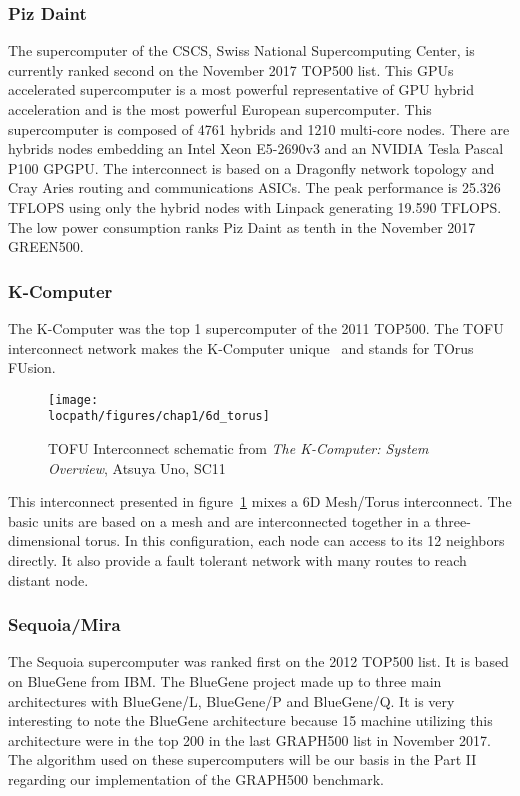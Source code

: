 \subsubsection{Piz Daint}
The supercomputer of the CSCS, Swiss National Supercomputing Center, is currently ranked second on the November 2017 TOP500 list. 
This GPUs accelerated supercomputer is a most powerful representative of GPU hybrid acceleration and is the most powerful European supercomputer. 
This supercomputer is composed of 4761 hybrids and 1210 multi-core nodes. 
There are hybrids nodes embedding an Intel Xeon E5-2690v3 and an NVIDIA Tesla Pascal P100 GPGPU. 
The interconnect is based on a Dragonfly network topology and Cray Aries routing and communications ASICs. 
The peak performance is 25.326 TFLOPS using only the hybrid nodes with Linpack generating 19.590 TFLOPS.
The low power consumption ranks Piz Daint as tenth in the November 2017 GREEN500.

\subsubsection{K-Computer}
The K-Computer was the top 1 supercomputer of the 2011 TOP500. 
The TOFU interconnect network makes the K-Computer unique~\cite{ajima2009tofu} and stands for TOrus FUsion.
\begin{figure}[t!]
\begin{center}
\texttt{[image: \\locpath/figures/chap1/6d\_torus]}
\end{center}
\caption[The TOFU Interconnect]{TOFU Interconnect schematic from \textit{The K-Computer: System Overview}, Atsuya Uno, SC11}
\label{fig:1_HPC:tofu}
\end{figure}
This interconnect presented in figure~\ref{fig:1_HPC:tofu} mixes a 6D Mesh/Torus interconnect.
The basic units are based on a mesh and are interconnected together in a three-dimensional torus. 
In this configuration, each node can access to its 12 neighbors directly. 
It also provide a fault tolerant network with many routes to reach distant node. 

\subsubsection{Sequoia/Mira}
The Sequoia supercomputer was ranked first on the 2012 TOP500 list. 
It is based on BlueGene from IBM.
The BlueGene project made up to three main architectures with BlueGene/L, BlueGene/P and BlueGene/Q.
It is very interesting to note the BlueGene architecture because 15 machine utilizing this architecture were in the top 200 in the last GRAPH500 list in November 2017.
The algorithm used on these supercomputers will be our basis in the Part II regarding our implementation of the GRAPH500 benchmark.

